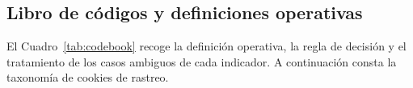 \documentclass[pdflatex,sn-basic,Numbered]{sn-jnl}
\theoremstyle{thmstyleone}
\theoremstyle{thmstyletwo}
\theoremstyle{thmstylethree}
\begin{document}
\begin{appendices}

\renewcommand{\thetable}{\thesection\arabic{table}}
\renewcommand{\thefigure}{\thesection\arabic{figure}}

\section{Libro de c\'odigos y definiciones operativas}\label{ap:codebook}
\setcounter{table}{0}\setcounter{figure}{0}

El Cuadro~\ref{tab:codebook} recoge la definici\'on operativa, la regla de decisi\'on y el tratamiento de los casos ambiguos de cada indicador. A continuaci\'on consta la taxonom\'ia de cookies de rastreo.


\end{appendices}
\end{document}
